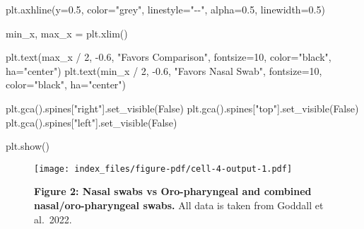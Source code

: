\documentclass[
  letterpaper,
  DIV=11,
  numbers=noendperiod]{scrartcl}
\newenvironment{Shaded}{\begin{snugshade}}{\end{snugshade}}
\newcommand{\DecValTok}[1]{\textcolor[rgb]{0.68,0.00,0.00}{#1}}
\newcommand{\FloatTok}[1]{\textcolor[rgb]{0.68,0.00,0.00}{#1}}
\newcommand{\NormalTok}[1]{\textcolor[rgb]{0.00,0.23,0.31}{#1}}
\newcommand{\OperatorTok}[1]{\textcolor[rgb]{0.37,0.37,0.37}{#1}}
\newcommand{\StringTok}[1]{\textcolor[rgb]{0.13,0.47,0.30}{#1}}
\newcommand{\VariableTok}[1]{\textcolor[rgb]{0.07,0.07,0.07}{#1}}
\begin{document}
\begin{Shaded}
\begin{Highlighting}[]
\NormalTok{plt.axhline(y}\OperatorTok{=}\FloatTok{0.5}\NormalTok{, color}\OperatorTok{=}\StringTok{"grey"}\NormalTok{, linestyle}\OperatorTok{=}\StringTok{"{-}{-}"}\NormalTok{, alpha}\OperatorTok{=}\FloatTok{0.5}\NormalTok{, linewidth}\OperatorTok{=}\FloatTok{0.5}\NormalTok{)}

\NormalTok{min\_x, max\_x }\OperatorTok{=}\NormalTok{ plt.xlim()}

\NormalTok{plt.text(max\_x }\OperatorTok{/} \DecValTok{2}\NormalTok{, }\OperatorTok{{-}}\FloatTok{0.6}\NormalTok{, }\StringTok{"Favors Comparison"}\NormalTok{, fontsize}\OperatorTok{=}\DecValTok{10}\NormalTok{, color}\OperatorTok{=}\StringTok{"black"}\NormalTok{, ha}\OperatorTok{=}\StringTok{"center"}\NormalTok{)}
\NormalTok{plt.text(min\_x }\OperatorTok{/} \DecValTok{2}\NormalTok{, }\OperatorTok{{-}}\FloatTok{0.6}\NormalTok{, }\StringTok{"Favors Nasal Swab"}\NormalTok{, fontsize}\OperatorTok{=}\DecValTok{10}\NormalTok{, color}\OperatorTok{=}\StringTok{"black"}\NormalTok{, ha}\OperatorTok{=}\StringTok{"center"}\NormalTok{)}


\NormalTok{plt.gca().spines[}\StringTok{"right"}\NormalTok{].set\_visible(}\VariableTok{False}\NormalTok{)}
\NormalTok{plt.gca().spines[}\StringTok{"top"}\NormalTok{].set\_visible(}\VariableTok{False}\NormalTok{)}
\NormalTok{plt.gca().spines[}\StringTok{"left"}\NormalTok{].set\_visible(}\VariableTok{False}\NormalTok{)}

\NormalTok{plt.show()}
\end{Highlighting}
\end{Shaded}

\begin{figure}[H]

{\centering \texttt{[image: index\_files/figure-pdf/cell-4-output-1.pdf]}

}

\caption{\textbf{Figure 2: Nasal swabs vs Oro-pharyngeal and combined
nasal/oro-pharyngeal swabs.} All data is taken from Goddall et
al.~2022.}

\end{figure}%
\end{document}
